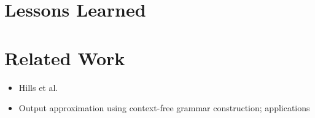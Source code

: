 \documentclass[preprint]{sig-alternate-05-2015}
\begin{document}
\section{Lessons Learned}

\section{Related Work}
\begin{itemize}
	\item Hills et al. \cite{Hills:2013:ESP:2483760.2483786}
	\item Output approximation using context-free grammar construction; applications \cite{minamide2005static,wassermann2007sound}
\end{itemize}



\end{document}
